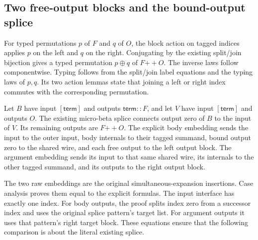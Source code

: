 \subsection{Two free-output blocks and the bound-output splice}
For typed permutations $p$ of $F$ and $q$ of $O$, the block action on tagged
indices applies $p$ on the left and $q$ on the right. Conjugating by the
existing split/join bijection gives a typed permutation $p\oplus q$ of $F{+\!+}O$.
The inverse laws follow componentwise. Typing follows from the split/join
label equations and the typing laws of $p,q$. Its two action lemmas state that
joining a left or right index commutes with the corresponding permutation.


Let $B$ have input $[\mathsf{term}]$ and outputs $\mathsf{term}::F$, and let
$V$ have input $[\mathsf{term}]$ and outputs $O$. The existing micro-beta splice
connects output zero of $B$ to the input of $V$. Its remaining outputs are
$F{+\!+}O$. The explicit body embedding sends the input to the outer input,
body internals to their tagged summand, bound output zero to the shared wire,
and each free output to the left output block. The argument embedding sends
its input to that same shared wire, its internals to the other tagged summand,
and its outputs to the right output block.

The two raw embeddings are the original simultaneous-expansion insertions.
Case analysis proves them equal to the explicit formulas. The input interface
has exactly one index. For body outputs, the proof splits index zero from a
successor index and uses the original splice pattern's target list. For
argument outputs it uses that pattern's right target block. These equations
ensure that the following comparison is about the literal existing splice.


